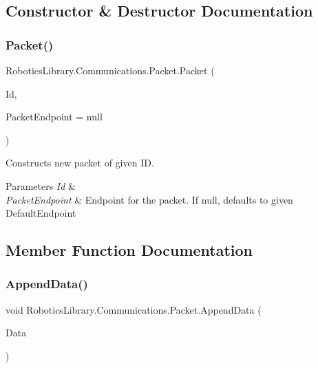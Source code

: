 \subsection{Constructor \& Destructor Documentation}
\mbox{\label{class_robotics_library_1_1_communications_1_1_packet_a959df60d7fb5b840f1ac17f2558287d9}} 
\subsubsection{\texorpdfstring{Packet()}{Packet()}}
{\footnotesize\ttfamily Robotics\+Library.\+Communications.\+Packet.\+Packet (\begin{DoxyParamCaption}\item[{int}]{Id,  }\item[{I\+P\+End\+Point}]{Packet\+Endpoint = {\ttfamily null} }\end{DoxyParamCaption})}



Constructs new packet of given ID. 


\begin{DoxyParams}{Parameters}
{\em Id} & \\
\hline
{\em Packet\+Endpoint} & Endpoint for the packet. If null, defaults to given {\ttfamily Default\+Endpoint}\\
\hline
\end{DoxyParams}


\subsection{Member Function Documentation}
\mbox{\label{class_robotics_library_1_1_communications_1_1_packet_a047afd1596cdeb703ff7fe965a6a15ee}} 
\subsubsection{\texorpdfstring{Append\+Data()}{AppendData()}}
{\footnotesize\ttfamily void Robotics\+Library.\+Communications.\+Packet.\+Append\+Data (\begin{DoxyParamCaption}\item[{byte \mbox{[}$\,$\mbox{]}}]{Data }\end{DoxyParamCaption})}



